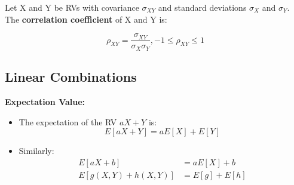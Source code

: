 \documentclass[10pt, letterpaper, twoside]{article}
\begin{document}
\begin{multicols}{2}
Let X and Y be RVs with covariance $\sigma_{XY}$ and standard deviations $\sigma_X$ and $\sigma_Y$. The \textbf{correlation coefficient} of X and Y is:

\begin{equation*}
    \rho_{XY} = \frac{\sigma_{XY}}{\sigma_X\sigma_Y}, -1\leq\rho_{XY} \leq 1
\end{equation*}

\subsection{Linear Combinations}
\textbf{Expectation Value:}
\begin{itemize}
    \item The expectation of the RV $aX+Y$ is:
    \begin{equation*}
       E[aX + Y] = aE[X] + E[Y]
    \end{equation*}
    \item Similarly:
    \begin{align*}
        E[aX + b] &= aE[X] + b\\
        E[g(X,Y) + h(X,Y)] &= E[g] + E[h]
    \end{align*}
\end{itemize}


\end{multicols}
\end{document}
